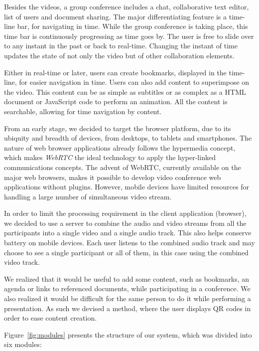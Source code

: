 \documentclass[10pt,conference]{IEEEtran}
\begin{document}
Besides the videos, a group conference includes a chat, collaborative text editor, list of users and document sharing.
The major differentiating feature is a time-line bar, for navigating in time.
While the group conference is taking place, this time bar is continuously progressing as time goes by.
The user is free to slide over to any instant in the past or back to real-time.
Changing the instant of time updates the state of not only the video but of other collaboration elements.

Either in real-time or later, users can create bookmarks, displayed in the time-line, for easier navigation in time.
Users can also add content to superimpose on the video.
This content can be as simple as subtitles or as complex as a \gls{HTML} document or JavaScript code to perform an animation.
All the content is searchable, allowing for time navigation by content.

From an early stage, we decided to target the browser platform, due to its ubiquity and breadth of devices, from desktops, to tablets and smartphones.
The nature of web browser applications already follows the hypermedia concept, which makes \emph{WebRTC} the ideal technology to apply the hyper-linked communications concepts.
The advent of \gls{WebRTC}, currently available on the major web browsers, makes it possible to develop video conference web applications without plugins.
However, mobile devices have limited resources for handling a large number of simultaneous video stream.

In order to limit the processing requirement in the client application (browser), we decided to use a server to combine the audio and video streams from all the participants into a single video and a single audio track.
This also helps conserve battery on mobile devices.
Each user listens to the combined audio track and may choose to see a single participant or all of them, in this case using the combined video track. 

We realized that it would be useful to add some content, such as bookmarks, an agenda or links to referenced documents, while participating in a conference.
We also realized it would be difficult for the same person to do it while performing a presentation.
As such we devised a method, where the user displays \gls{QR} codes in order to ease content creation.


Figure~\ref{fig:modules} presents the structure of our system, which was divided into six modules:
\end{document}
